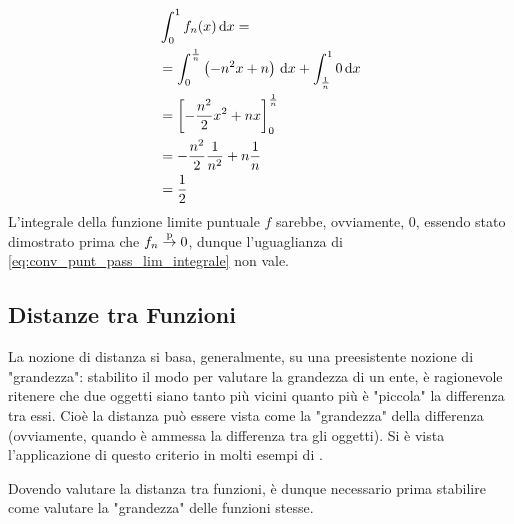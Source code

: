 \begin{example}
\begin{align*}
		&\int_0^1 f_n(x) \,\mathrm{d}{x} =\\
		&= \int_0^{\frac{1}{n}} \left( -n^2x + n \right)\,\mathrm{d}{x} + \int_{\frac{1}{n}}^1 0 \,\mathrm{d}{x}\\
		&= \left[ -\frac{n^2}{2}x^2 + nx \right]_0^{\frac{1}{n}}\\
		&= -\frac{n^2}{2}\frac{1}{n^2} + n \frac{1}{n}\\
		&= \frac{1}{2}
	\end{align*}
	L'integrale della funzione limite puntuale $f$ sarebbe, ovviamente, $0$, essendo stato dimostrato prima che $f_n \overset{\text{p}}{\to} 0$, dunque l'uguaglianza di \cref{eq:conv_punt_pass_lim_integrale} non vale.
\end{example}

\subsection{Distanze tra Funzioni}\label{sect:dist_funz}
La nozione di distanza si basa, generalmente, su una preesistente nozione di "grandezza": stabilito il modo per valutare la grandezza di un ente, è ragionevole ritenere che due oggetti siano tanto più vicini quanto più è "piccola" la differenza tra essi. Cioè la distanza può essere vista come la "grandezza" della differenza (ovviamente, quando è ammessa la differenza tra gli oggetti). Si è vista l'applicazione di questo criterio in molti esempi di .

Dovendo valutare la distanza tra funzioni, è dunque necessario prima stabilire come valutare la "grandezza" delle funzioni stesse.

